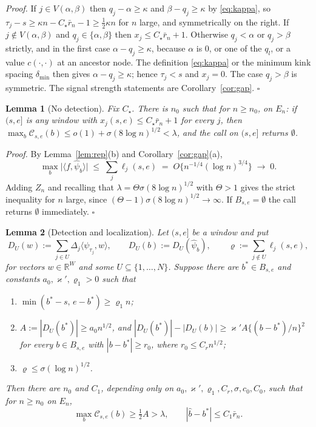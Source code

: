 \documentclass[12pt, a4paper]{article}
\newcommand{\qed}{\hfill$\square$}
\newenvironment{proof}[1][Proof]{\par\noindent\textit{#1.}\space}{\qed\par\medskip}
\newtheorem{lemma}{Lemma}[section]
\begin{document}
\begin{proof}
If $j \in V(\alpha,\beta)$ then $q_j - \alpha \ge \kappa$ and
$\beta - q_j \ge \kappa$ by \eqref{eq:kappa}, so
$\tau_j - s \ge \kappa n - C_\star\bar r_n - 1 \ge \tfrac12\kappa n$ for $n$
large, and symmetrically on the right. If $j \notin V(\alpha,\beta)$ and
$q_j \in \{\alpha,\beta\}$ then $x_j \le C_\star\bar r_n + 1$. Otherwise
$q_j < \alpha$ or $q_j > \beta$ strictly, and in the first case
$\alpha - q_j \ge \kappa$, because $\alpha$ is $0$, or one of the $q_l$, or a
value $c(\cdot,\cdot)$ at an ancestor node. The definition \eqref{eq:kappa}
or the minimum kink spacing $\delta_{\min}$ then gives
$\alpha-q_j\ge\kappa$; hence $\tau_j<s$ and
$x_j = 0$. The case $q_j > \beta$ is symmetric. The signal strength statements are
Corollary~\ref{cor:gap}.
\end{proof}

\begin{lemma}[No detection]
\label{lem:nodet}
Fix $C_\star$. There is $n_0$ such that for $n \ge n_0$, on $E_n$: if $(s,e]$
is any window with $x_j(s,e) \le C_\star\bar r_n + 1$ for every $j$, then
$\max_b \mathcal{C}_{s,e}(b) \le o(1) + \sigma(8\log n)^{1/2} < \lambda$, and
the call on $(s,e]$ returns $\emptyset$.
\end{lemma}

\begin{proof}
By Lemma~\ref{lem:rep}(b) and Corollary~\ref{cor:gap}(a),
\[
\max_b \big|\langle f,\hat\psi_b\rangle\big| \;\le\; \sum_j \ell_j(s,e) \;=\; O\big\{n^{-1/4}(\log n)^{3/4}\big\} \;\to\; 0 .
\]
Adding $Z_n$ and recalling that $\lambda = \Theta\sigma(8\log n)^{1/2}$ with $\Theta > 1$ gives the strict inequality for $n$ large, since $(\Theta-1)\sigma(8\log n)^{1/2} \to \infty$.
If $B_{s,e} = \emptyset$ the call returns $\emptyset$ immediately.
\end{proof}

\begin{lemma}[Detection and localization]
\label{lem:loc}
Let $(s,e]$ be a window and put
\[
D_U(w):=\sum_{j\in U}\Delta_j\langle\psi_{\tau_j},w\rangle,
\qquad D_U(b):=D_U(\hat\psi_b),
\qquad
\varrho := \sum_{j\notin U}\ell_j(s,e) ,
\]
for vectors $w\in\mathbb R^W$ and some
$U\subseteq\{1,\ldots,N\}$. Suppose there are $b^* \in B_{s,e}$ and constants $a_0, \varkappa', \varrho_1 > 0$ such that
\begin{enumerate}
\item[(i)] $\min(b^*-s,\, e-b^*) \ge \varrho_1 n$;
\item[(ii)] $A := |D_U(b^*)| \ge a_0 n^{1/2}$, and
$|D_U(b^*)| - |D_U(b)| \ge \varkappa' A \{(b-b^*)/n\}^2$
for every $b \in B_{s,e}$ with $|b-b^*| \ge r_0$, where $r_0 \le C_r n^{1/2}$;
\item[(iii)] $\varrho \le \sigma(\log n)^{1/2}$.
\end{enumerate}
Then there are $n_0$ and $C_1$, depending only on $a_0,\varkappa',\varrho_1,C_r,\sigma,c_0,C_0$, such that for $n \ge n_0$ on
$E_n$,
\[
\max_b \mathcal{C}_{s,e}(b) \ge \tfrac12 A > \lambda,
\qquad
|\hat b - b^*| \le C_1 \bar r_n .
\]
\end{lemma}
\end{document}
